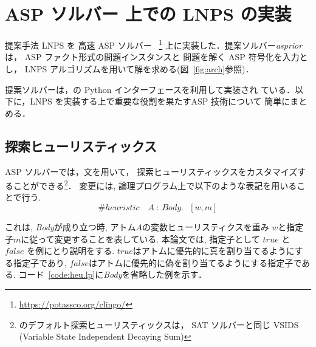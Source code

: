 \chapter{ASP ソルバー 上での LNPS の実装}



提案手法 LNPS を 高速 ASP ソルバー
{\clingo}~\footnote{\url{https://potassco.org/clingo/}}
上に実装した．提案ソルバー\textit{asprior}は，
ASP ファクト形式の問題インスタンスと
問題を解く ASP 符号化を入力とし，
LNPS アルゴリズムを用いて解を求める(図~\ref{fig:arch}参照)．

提案ソルバーは，{\clingo}の Python インターフェースを利用して実装され
ている．以下に，LNPS を実装する上で重要な役割を果たすASP 技術について
簡単にまとめる．

\section{探索ヒューリスティックス}






ASP ソルバー{\clingo}では，文を用いて，
探索ヒューリスティックスをカスタマイズすることができる\footnote{%
{\clingo}のデフォルト探索ヒューリスティックスは，
SAT ソルバーと同じ VSIDS (Variable State Independent Decaying Sum)}．
変更には, 論理プログラム上で以下のような表記を用いることで行う. 
\begin{displaymath}
\#heuristic \quad A~ : ~Body. ~~~[w,m]
\end{displaymath}

これは, \textit{Body}が成り立つ時, アトム$A$の変数ヒューリスティクスを重み
$w$と指定子$m$に従って変更することを表している. 
本論文では, 指定子として $true$ と $false$ を例にとり説明をする. 
$true$はアトムに優先的に真を割り当てるようにする指定子であり, 
$false$はアトムに優先的に偽を割り当てるようにする指定子である. 
コード~\ref{code:heu.lp}に\textit{Body}を省略した例を示す．


